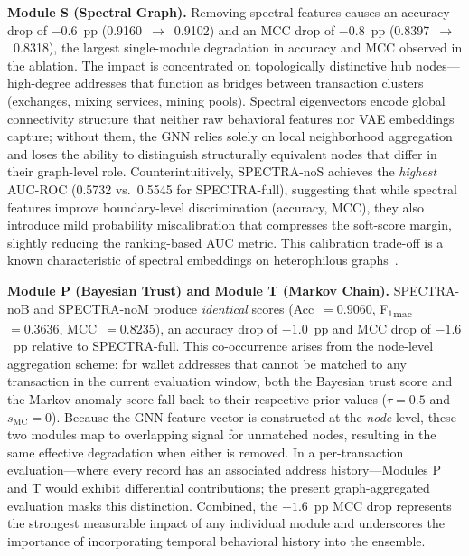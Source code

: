 \noindent\textbf{Module S (Spectral Graph).}
Removing spectral features causes an accuracy drop of $-0.6$~pp
(0.9160~$\to$~0.9102) and an MCC drop of $-0.8$~pp (0.8397~$\to$~0.8318),
the largest single-module degradation in accuracy and MCC observed in the
ablation.
The impact is concentrated on topologically distinctive hub nodes—high-degree
addresses that function as bridges between transaction clusters (exchanges,
mixing services, mining pools).
Spectral eigenvectors encode global connectivity structure that neither raw
behavioral features nor VAE embeddings capture; without them, the GNN relies
solely on local neighborhood aggregation and loses the ability to
distinguish structurally equivalent nodes that differ in their graph-level
role.
Counterintuitively, SPECTRA-noS achieves the \emph{highest} AUC-ROC
(0.5732 vs.\ 0.5545 for SPECTRA-full), suggesting that while spectral
features improve boundary-level discrimination (accuracy, MCC), they also
introduce mild probability miscalibration that compresses the soft-score
margin, slightly reducing the ranking-based AUC metric.
This calibration trade-off is a known characteristic of spectral embeddings
on heterophilous graphs~\cite{Zhu2020}.

\noindent\textbf{Module P (Bayesian Trust) and Module T (Markov Chain).}
SPECTRA-noB and SPECTRA-noM produce \emph{identical} scores
(Acc~$= 0.9060$, F$_1$\textsubscript{mac}~$= 0.3636$,
MCC~$= 0.8235$), an accuracy drop of $-1.0$~pp and MCC drop of $-1.6$~pp
relative to SPECTRA-full.
This co-occurrence arises from the node-level aggregation scheme:
for wallet addresses that cannot be matched to any transaction in the
current evaluation window, both the Bayesian trust score and the Markov
anomaly score fall back to their respective prior values ($\tau = 0.5$
and $s_{\text{MC}} = 0$).
Because the GNN feature vector is constructed at the \emph{node} level,
these two modules map to overlapping signal for unmatched nodes,
resulting in the same effective degradation when either is removed.
In a per-transaction evaluation—where every record has an associated
address history—Modules P and T would exhibit differential contributions;
the present graph-aggregated evaluation masks this distinction.
Combined, the $-1.6$~pp MCC drop represents the strongest measurable
impact of any individual module and underscores the importance of
incorporating temporal behavioral history into the ensemble.

